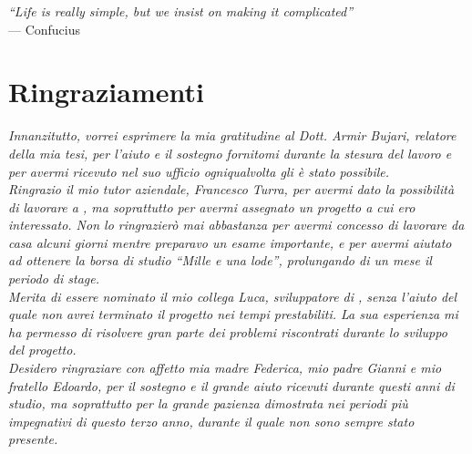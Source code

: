 
\cleardoublepage
{}
{}

\begin{flushright}{
	\slshape    
	``Life is really simple, but we insist on making it complicated''} \\ 
	\medskip
    --- Confucius
\end{flushright}


\bigskip

\begingroup
\let\clearpage\relax
\let\cleardoublepage\relax
\let\cleardoublepage\relax

\chapter*{Ringraziamenti}

\noindent \textit{Innanzitutto, vorrei esprimere la mia gratitudine al Dott. Armir Bujari, relatore della mia tesi, per l'aiuto e il sostegno fornitomi durante la stesura del lavoro e per avermi ricevuto nel suo ufficio ogniqualvolta gli è stato possibile.}\\

\noindent \textit{Ringrazio il mio tutor aziendale, Francesco Turra, per avermi dato la possibilità di lavorare a \visione{}, ma soprattutto per avermi assegnato un progetto a cui ero interessato. Non lo ringrazierò mai abbastanza per avermi concesso di lavorare da casa alcuni giorni mentre preparavo un esame importante, e per avermi aiutato ad ottenere la borsa di studio ``Mille e una lode'', prolungando di un mese il periodo di stage.}\\

\noindent \textit{Merita di essere nominato il mio collega Luca, sviluppatore di \visione{}, senza l'aiuto del quale non avrei terminato il progetto nei tempi prestabiliti. La sua esperienza mi ha permesso di risolvere gran parte dei problemi riscontrati durante lo sviluppo del progetto.}\\

\noindent \textit{Desidero ringraziare con affetto mia madre Federica, mio padre Gianni e mio fratello Edoardo, per il sostegno e il grande aiuto ricevuti durante questi anni di studio, ma soprattutto per la grande pazienza dimostrata nei periodi più impegnativi di questo terzo anno, durante il quale non sono sempre stato presente.}\\

